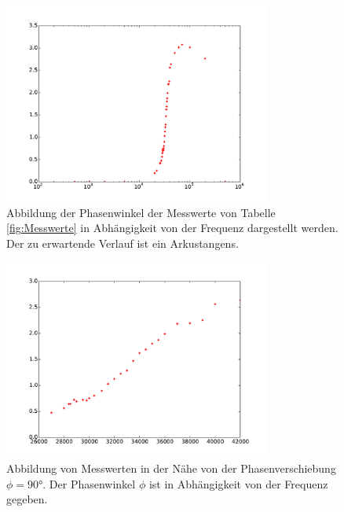 \begin{figure}
  \centering
  \includegraphics[width=0.78\textwidth]{phasenverschiebung.pdf}
  \caption{Abbildung der Phasenwinkel der Messwerte von Tabelle \ref{fig:Messwerte} in
  Abhängigkeit von der Frequenz dargestellt werden. Der zu erwartende Verlauf ist
  ein Arkustangens.}
  \label{fig:phasenverschiebung}
\end{figure}
\begin{figure}
  \centering
  \includegraphics[width=0.78\textwidth]{linphasenverschiebung.pdf}
  \caption{Abbildung von Messwerten in der Nähe von der Phasenverschiebung $\phi=90°$.
          Der Phasenwinkel $\phi$ ist in Abhängigkeit von der Frequenz gegeben.}
  \label{fig:linphasenverschiebung}
\end{figure}
